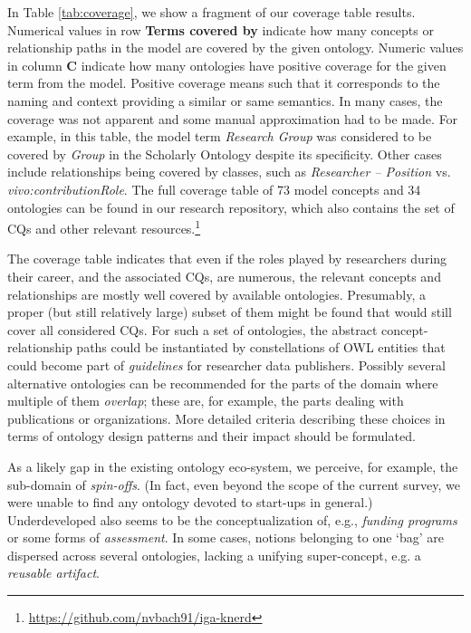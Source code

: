 In Table \ref{tab:coverage}, we show a fragment of our coverage table results. Numerical values in row \textbf{Terms covered by} indicate how many concepts or relationship paths in the model are covered by the given ontology. Numeric values in column \textbf{C} indicate how many ontologies have 
positive coverage for the given term from the model. Positive coverage means such that it corresponds to the naming and context providing a similar or same semantics. In many cases, the coverage was not apparent and some manual approximation had to be made. For example, in this table, the model term \emph{Research Group} was considered to be covered by \emph{Group} in the Scholarly Ontology despite its specificity. Other cases include relationships being covered by classes, such as \emph{Researcher -- Position} vs. \emph{vivo:contributionRole}. The full coverage table of 73 model concepts and 34 ontologies can be found in our research repository, which also contains the set of CQs and other relevant resources.\footnote{\url{https://github.com/nvbach91/iga-knerd}}



The coverage table indicates that even if the roles played by researchers during their career, and the associated CQs, are numerous, the relevant concepts and relationships are mostly well covered by available ontologies.
Presumably, a proper (but still relatively large) subset of them might be found that would still cover all considered CQs.
For such a set of ontologies, the abstract concept-relationship paths could be instantiated by constellations of OWL entities that could become part of \emph{guidelines} for researcher data publishers. 
Possibly several alternative ontologies can be recommended for the parts of the domain where multiple of them \emph{overlap}; these are, for example, the parts dealing with publications or organizations.
More detailed criteria describing these choices in terms of ontology design patterns and their impact should be formulated.

As a likely gap in the existing ontology eco-system, we perceive, for example, the sub-domain of \emph{spin-offs}.
(In fact, even beyond the scope of the current survey, we were unable to find any ontology devoted to start-ups in general.)
Underdeveloped also seems to be the conceptualization of, e.g., \emph{funding programs} or some forms of \emph{assessment}.
In some cases, notions belonging to one `bag' are dispersed across several ontologies, lacking a unifying super-concept, e.g. a \emph{reusable artifact}.

